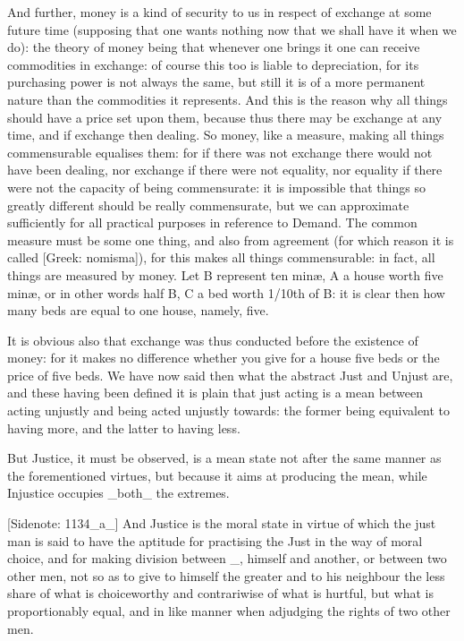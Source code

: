 And further, money is a kind of security to us in respect of exchange
at some future time (supposing that one wants nothing now that we shall
have it when we do): the theory of money being that whenever one brings
it one can receive commodities in exchange: of course this too is liable
to depreciation, for its purchasing power is not always the same,
but still it is of a more permanent nature than the commodities it
represents. And this is the reason why all things should have a price
set upon them, because thus there may be exchange at any time, and if
exchange then dealing. So money, like a measure, making all things
commensurable equalises them: for if there was not exchange there would
not have been dealing, nor exchange if there were not equality, nor
equality if there were not the capacity of being commensurate: it
is impossible that things so greatly different should be really
commensurate, but we can approximate sufficiently for all practical
purposes in reference to Demand. The common measure must be some one
thing, and also from agreement (for which reason it is called [Greek:
nomisma]), for this makes all things commensurable: in fact, all things
are measured by money. Let B represent ten minæ, A a house worth five
minæ, or in other words half B, C a bed worth 1/10th of B: it is clear
then how many beds are equal to one house, namely, five.

It is obvious also that exchange was thus conducted before the existence
of money: for it makes no difference whether you give for a house five
beds or the price of five beds. We have now said then what the abstract
Just and Unjust are, and these having been defined it is plain that
just acting is a mean between acting unjustly and being acted unjustly
towards: the former being equivalent to having more, and the latter to
having less.

But Justice, it must be observed, is a mean state not after the same
manner as the forementioned virtues, but because it aims at producing
the mean, while Injustice occupies _both_ the extremes.

[Sidenote: 1134_a_] And Justice is the moral state in virtue of which
the just man is said to have the aptitude for practising the Just in
the way of moral choice, and for making division between _, himself and
another, or between two other men, not so as to give to himself the
greater and to his neighbour the less share of what is choiceworthy and
contrariwise of what is hurtful, but what is proportionably equal, and
in like manner when adjudging the rights of two other men.

